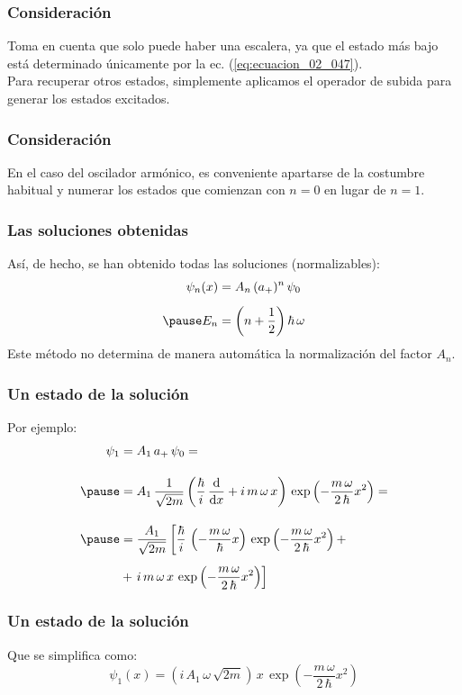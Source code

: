 \documentclass[12pt]{beamer}
\begin{document}
\begin{frame}
\frametitle{Consideración}
Toma en cuenta que solo puede haber una escalera, ya que el estado más bajo está determinado únicamente por la ec. (\ref{eq:ecuacion_02_047}).
\\
\bigskip
\pause
Para recuperar otros estados, simplemente aplicamos el operador de subida para generar los estados excitados.
\end{frame}
\begin{frame}
\frametitle{Consideración}
En el caso del oscilador armónico, es conveniente apartarse de la costumbre habitual y numerar los estados que comienzan con $n = 0$ en lugar de $n = 1$.
\end{frame}
\begin{frame}
\frametitle{Las soluciones obtenidas}
Así, de hecho, se han obtenido todas las soluciones (normalizables):
\pause
\begin{eqnarray}
\begin{aligned}
\psi_{n} (x) &= A_{n} \, (a_{+})^{n} \, \psi_{0} \\[0.5em]\pause
E_{n} &= \left( n + \dfrac{1}{2} \right) \hbar \, \omega
\end{aligned}
\label{eq:ecuacion_02_050}
\end{eqnarray}
\pause
Este método no determina de manera automática la normalización del factor $A_{n}$.
\end{frame}
\begin{frame}
\frametitle{Un estado de la solución}
Por ejemplo:
\begin{eqnarray*}
\begin{aligned}
\psi_{1} &= A_{1} \, a_{+} \, \psi_{0} = \\[1em] \pause
&= A_{1} \, \dfrac{1}{\sqrt{2 m}} \left( \dfrac{\hbar}{i} \, \dv{x} + i \, m \, \omega \, x \right) \, \exp \left( - \dfrac{m \, \omega}{2 \, \hbar} x^{2} \right) = \\[1em] \pause
&= \dfrac{A_{1}}{\sqrt{2 m}} \left[ \dfrac{\hbar}{i} \, \left( - \dfrac{m \, \omega}{\hbar} x \right)  \, \exp \left( - \dfrac{m \, \omega}{2 \, \hbar} x^{2} \right) +  \right.\\[0.5em]
&+ \left. i \, m \, \omega \, x \, \exp \left( - \dfrac{m \, \omega}{2 \, \hbar} x^{2} \right) \right] 
\end{aligned}
\end{eqnarray*}
\end{frame}
\begin{frame}
\frametitle{Un estado de la solución}
Que se simplifica como:
\pause
\begin{equation}
\psi_{1} (x) = \left( i \, A_{1} \, \omega \, \sqrt{2 m }  \right) \, x \, \exp \left( - \dfrac{m \, \omega}{2 \, \hbar} x^{2} \right)
\label{eq:ecuacion_02_051}
\end{equation}
\end{frame}
\end{document}
